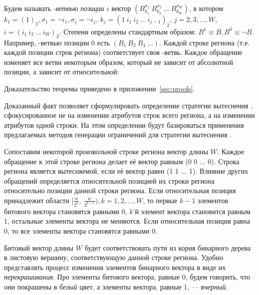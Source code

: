 \begin{enumerate}
Будем называть \emph{\PseudoLRU-ветвью позиции $i$} вектор
$(B_{k_1}^{\sigma_1}~B_{k_2}^{\sigma_2}~\dots~B_{k_W}^{\sigma_W})$,
в котором $k_1 = (1)_2, \sigma_1 = \neg i_1, \sigma_j = \neg i_j$, $k_j = (1~i_1~i_2~\dots~i_{j-1})_2$, $j = 2, 3, \dots, W$, $i = (i_1~i_2~\dots~i_W)_2$. Степени определены стандартным образом: $B^1 \equiv B, B^0 \equiv \neg B$. Например, \PseudoLRU-ветвью позиции 0 есть $(B_1~B_2~B_4~...)$. Каждой строке региона (т.е. каждой позиции строк региона) соответствует своя \PseudoLRU-ветвь. Каждое обращение изменяет все ветви некоторым образом, который не зависит от абсолютной позиции, а зависит от относительной:

\begin{theorem}\label{thm_pseudoLRU_invariant} \PseudoLRUInvariant
\end{theorem}
Доказательство теоремы приведено в приложении~\ref{sec:proofs}.

Доказанный факт позволяет сформулировать определение стратегии
вытеснения \PseudoLRU, сфокусированное не на изменении атрибутов строк всего
региона,
а на изменении атрибутов одной строки. На этом определении
будут базироваться применения предлагаемых методов генерации
ограничений для стратегии вытеснения \PseudoLRU.

\begin{utv}
Сопоставим некоторой произвольной строке региона вектор длины $W$. Каждое обращение к этой строке региона делает её вектор равным (0 0 ... 0). Строка региона является вытесняемой, если её вектор равен (1 1 ... 1).
Влияние других обращений определяется относительной позицией их
строки региона относительно позиции данной строки региона. Если относительная позиция
принадлежит области $[\frac{w}{2^k},~\frac{w}{2^{k-1}}), k =
1,2,...,W$, то первые $k{-}1$ элементов битового вектора становятся равными
0, $k$'й элемент вектора становится равным 1, остальные элементы
вектора не меняются. Если относительная позиция равна 0, то все элементы вектора становятся равными 0.
\end{utv}

Битовый вектор длины $W$ будет соответствовать пути из корня бинарного
дерева в листовую вершину, соответствующую данной строке региона.
Удобно представлять процесс изменения элементов бинарного вектора  в виде их
\emph{перекрашивания}. Про элементы битового вектора, равные 0,
будем говорить, что они покрашены в \emph{белый} цвет, а элементы вектора, равные 1, --- в\emph{черный}.


\end{enumerate}
